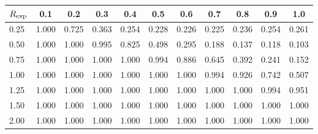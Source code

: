 \begin{tabular}{lcccccccccc}
\toprule
$R_{\rm exp}$ & 0.1 & 0.2 & 0.3 & 0.4 & 0.5 & 0.6 & 0.7 & 0.8 & 0.9 & 1.0 \\
\midrule
0.25 & 1.000 & 0.725 & 0.363 & 0.254 & 0.228 & 0.226 & 0.225 & 0.236 & 0.254 & 0.261 \\
0.50 & 1.000 & 1.000 & 0.995 & 0.825 & 0.498 & 0.295 & 0.188 & 0.137 & 0.118 & 0.103 \\
0.75 & 1.000 & 1.000 & 1.000 & 1.000 & 0.994 & 0.886 & 0.645 & 0.392 & 0.241 & 0.152 \\
1.00 & 1.000 & 1.000 & 1.000 & 1.000 & 1.000 & 1.000 & 0.994 & 0.926 & 0.742 & 0.507 \\
1.25 & 1.000 & 1.000 & 1.000 & 1.000 & 1.000 & 1.000 & 1.000 & 1.000 & 0.994 & 0.951 \\
1.50 & 1.000 & 1.000 & 1.000 & 1.000 & 1.000 & 1.000 & 1.000 & 1.000 & 1.000 & 1.000 \\
2.00 & 1.000 & 1.000 & 1.000 & 1.000 & 1.000 & 1.000 & 1.000 & 1.000 & 1.000 & 1.000 \\
\bottomrule
\end{tabular}
